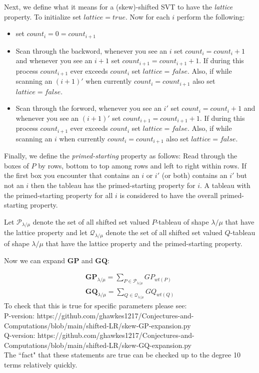 \documentclass[]{amsart}
\theoremstyle{definition}
\begin{document}
Next, we define what it means for a (skew)-shifted SVT to have the \emph{lattice} property.  To initialize set $lattice=true$. Now for each $i$ perform the following:
\begin{itemize}
\item set $count_i=0=count_{i+1}$
\item Scan through the backword, whenever you see an $i$ set $count_i=count_i+1$ and whenever you see an $i+1$ set $count_{i+1}=count_{i+1}+1$.  If during this process $count_{i+1}$ ever exceeds $count_i$ set $lattice=false$. Also, if while scanning an $(i+1)'$ when currently $count_i=count_{i+1}$ also set $lattice=false$.
\item Scan through the forword, whenever you see an $i'$ set $count_i=count_i+1$ and whenever you see an $(i+1)'$ set $count_{i+1}=count_{i+1}+1$.  If during this process $count_{i+1}$ ever exceeds $count_i$ set $lattice=false$. Also, if while scanning an $i$ when currently $count_i=count_{i+1}$ also set $lattice=false$.
\end{itemize}



Finally, we define the \emph{primed-starting} property as follows: Read through the boxes of $P$ by rows, bottom to top among rows and left to right within rows.  If the first box you encounter that contains an $i$ or $i'$ (or both) contains an $i'$ but not an $i$ then the tableau has the primed-starting property for $i$. A tableau with the primed-starting property for all $i$ is considered to have the overall primed-starting property.  

Let $\mathcal{P}_{\lambda/\mu}$ denote the set of all shifted set valued $P$-tableau of shape $\lambda/\mu$ that have the lattice property and let $\mathcal{Q}_{\lambda/\mu}$ denote the set of all shifted set valued $Q$-tableau of shape $\lambda/\mu$ that have the lattice property and the primed-starting property.

Now we can expand $\mathbf{GP}$ and $\mathbf{GQ}$:

\begin{eqnarray*}
\mathbf{GP}_{\lambda/\mu}=\sum_{P \in \mathcal{P_{\lambda/\mu}}} GP_{wt(P)}\\
\mathbf{GQ}_{\lambda/\mu}=\sum_{Q \in \mathcal{Q_{\lambda/\mu}}} GQ_{wt(Q)}
\end{eqnarray*}
To check that this is true for specific parameters please see:\\
P-version: https://github.com/ghawkes1217/Conjectures-and-Computations/blob/main/shifted-LR/skew-GP-expansion.py\\
Q-version: https://github.com/ghawkes1217/Conjectures-and-Computations/blob/main/shifted-LR/skew-GQ-expansion.py\\
The ``fact" that these statements are true can be checked up to the degree 10 terms relatively quickly.   
\end{document}
